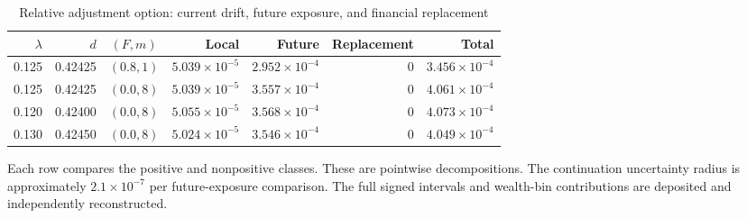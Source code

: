 \begin{table}[tbp]
\centering
\caption{Relative adjustment option: current drift, future exposure, and financial replacement}\label{tab:r12_exposure}
\begin{tabular}{rrcrrrr}
\toprule
$\lambda$ & $d$ & $(F,m)$ & Local & Future & Replacement & Total \\
\midrule
0.125 & 0.42425 & $(0.8,1)$ & $5.039\times10^{-5}$ & $2.952\times10^{-4}$ & $0$ & $3.456\times10^{-4}$ \\
0.125 & 0.42425 & $(0.0,8)$ & $5.039\times10^{-5}$ & $3.557\times10^{-4}$ & $0$ & $4.061\times10^{-4}$ \\
0.120 & 0.42400 & $(0.0,8)$ & $5.055\times10^{-5}$ & $3.568\times10^{-4}$ & $0$ & $4.073\times10^{-4}$ \\
0.130 & 0.42450 & $(0.0,8)$ & $5.024\times10^{-5}$ & $3.546\times10^{-4}$ & $0$ & $4.049\times10^{-4}$ \\
\bottomrule
\end{tabular}
\par\smallskip
{\footnotesize Each row compares the positive and nonpositive classes. These are pointwise decompositions. The continuation uncertainty radius is approximately $2.1\times10^{-7}$ per future-exposure comparison. The full signed intervals and wealth-bin contributions are deposited and independently reconstructed.}
\end{table}
